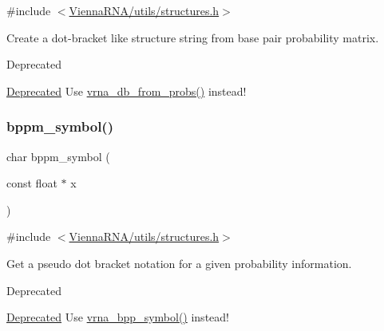 {\ttfamily \#include $<$\hyperlink{utils_2structures_8h}{Vienna\+R\+N\+A/utils/structures.\+h}$>$}



Create a dot-\/bracket like structure string from base pair probability matrix. 

\begin{DoxyRefDesc}{Deprecated}
\item[\hyperlink{deprecated__deprecated000195}{Deprecated}]Use \hyperlink{group__struct__utils_ga0c28c410a5ab22d6ab9c77a84e8d5b44}{vrna\+\_\+db\+\_\+from\+\_\+probs()} instead!\end{DoxyRefDesc}
\mbox{\label{group__struct__utils__deprecated_ga49962ad6242b8c628de6ca16bb831c1d}} 
\subsubsection{\texorpdfstring{bppm\+\_\+symbol()}{bppm\_symbol()}}
{\footnotesize\ttfamily char bppm\+\_\+symbol (\begin{DoxyParamCaption}\item[{const float $\ast$}]{x }\end{DoxyParamCaption})}



{\ttfamily \#include $<$\hyperlink{utils_2structures_8h}{Vienna\+R\+N\+A/utils/structures.\+h}$>$}



Get a pseudo dot bracket notation for a given probability information. 

\begin{DoxyRefDesc}{Deprecated}
\item[\hyperlink{deprecated__deprecated000196}{Deprecated}]Use \hyperlink{group__struct__utils_ga025bff1b27fa46534c8fae6980f64bb5}{vrna\+\_\+bpp\+\_\+symbol()} instead!\end{DoxyRefDesc}
